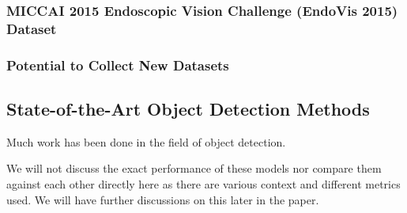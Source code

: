 
\subsubsection{MICCAI 2015 Endoscopic Vision Challenge (EndoVis 2015) Dataset}


\subsubsection{Potential to Collect New Datasets}




\subsection{State-of-the-Art Object Detection Methods}

Much work has been done in the field of object detection.

We will not discuss the exact performance of these models nor compare them against each other directly here as there are various context and different metrics used. We will have further discussions on this later in the paper.

